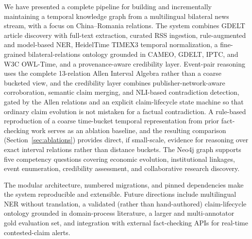 \documentclass[conference]{IEEEtran}
\begin{document}
We have presented a complete pipeline for building and incrementally
maintaining a temporal knowledge graph from a multilingual bilateral news
stream, with a focus on China--Romania relations. The system combines GDELT
article discovery with full-text extraction, curated RSS ingestion,
rule-augmented and model-based NER, HeidelTime TIMEX3 temporal
normalization, a fine-grained bilateral-relations ontology grounded in
CAMEO, GDELT, IPTC, and W3C OWL-Time, and a provenance-aware credibility
layer. Event-pair reasoning uses the complete 13-relation Allen Interval
Algebra rather than a coarse bucketed view, and the credibility layer
combines publisher-network-aware corroboration, semantic claim merging, and
NLI-based contradiction detection, gated by the Allen relations and an
explicit claim-lifecycle state machine so that ordinary claim evolution is
not mistaken for a factual contradiction. A rule-based reproduction of a
coarse time-bucket temporal representation from prior fact-checking work
serves as an ablation baseline, and the resulting comparison (Section~\ref{sec:ablations})
provides direct, if small-scale, evidence for reasoning over exact interval
relations rather than distance buckets. The Neo4j graph supports five
competency questions covering economic evolution, institutional linkages,
event enumeration, credibility assessment, and collaborative research
discovery.

The modular architecture, numbered migrations, and pinned dependencies make
the system reproducible and extensible. Future directions include
multilingual NER without translation, a validated (rather than hand-authored)
claim-lifecycle ontology grounded in domain-process literature, a larger and
multi-annotator gold evaluation set, and integration with external
fact-checking APIs for real-time contested-claim alerts.
\end{document}
